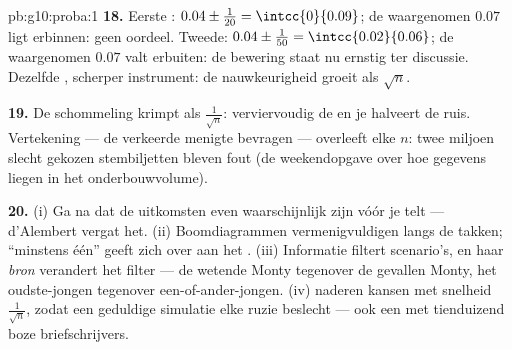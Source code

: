 \begin{solution}{pb:g10:proba:1}
\textbf{18.} Eerste : 
$0.04 \pm \frac{1}{20} = \intcc{0}{0.09}$; de waargenomen $0.07$ ligt
erbinnen: geen oordeel. Tweede: $0.04 \pm \frac{1}{50} = \intcc{0.02}{0.06}$;
de waargenomen $0.07$ valt erbuiten: de bewering staat nu ernstig ter
discussie. Dezelfde , scherper instrument: de nauwkeurigheid groeit
als $\sqrt n$.

\textbf{19.} De schommeling krimpt als $\frac{1}{\sqrt n}$: verviervoudig de
 en je halveert de ruis. Vertekening --- de verkeerde menigte
bevragen --- overleeft elke $n$: twee miljoen slecht gekozen stembiljetten
bleven fout (de weekendopgave over hoe gegevens liegen in het
onderbouwvolume).

\textbf{20.} (i) Ga na dat de uitkomsten even waarschijnlijk zijn vóór je
telt --- d'Alembert vergat het. (ii) Boomdiagrammen vermenigvuldigen langs de
takken; ``minstens één'' geeft zich over aan het . (iii) Informatie
filtert scenario's, en haar \emph{bron} verandert het filter --- de wetende
Monty tegenover de gevallen Monty, het oudste-jongen tegenover
een-of-ander-jongen. (iv)  naderen kansen met snelheid
$\frac{1}{\sqrt n}$, zodat een geduldige simulatie elke ruzie beslecht ---
ook een met tienduizend boze briefschrijvers.
\end{solution}

